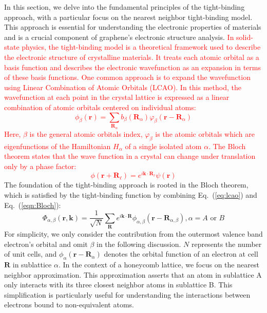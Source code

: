 In this section, we delve into the fundamental principles of the tight-binding approach, with a particular focus on the nearest neighbor tight-binding model. This approach is essential for understanding the electronic properties of materials and is a crucial component of graphene's electronic structure analysis.
\textcolor{red}{In solid-state physics, the tight-binding model is a theoretical framework used to describe the electronic structure of crystalline materials. It treats each atomic orbital as a basis function and describes the electronic wavefunction as an expansion in terms of these basis functions. One common approach is to expand the wavefunction using Linear Combination of Atomic Orbitals (\gls{LCAO}). In this method, the wavefunction at each point in the crystal lattice is expressed as a linear combination of atomic orbitals centered on individual atoms:}
\textcolor{red}{
	\begin{equation}
		\phi_{\beta}(\mathbf{r})=\sum_{\mathbf{R}_{\alpha}} b_{\beta}\left(\mathbf{R}_{\alpha}\right) \varphi_{\beta}\left(\mathbf{r}-\mathbf{R}_{\alpha}\right)
		\label{eq:lcao}
	\end{equation}
	Here, $\beta$ is the general atomic orbitals index, $\varphi_{\beta}$ is the atomic orbitals which are eigenfunctions of the Hamiltonian $H_{\alpha}$ of a single isolated atom $\alpha$.
	The Bloch theorem states that the wave function in a crystal can change under translation only by a phase factor:
	\begin{equation}
		\phi\left(\mathbf{r}+\mathbf{R}_{\ell}\right)=e^{i \mathbf{k} \cdot \mathbf{R}_{\ell}} \psi(\mathbf{r})
		\label{eqn:bloch}
	\end{equation}
}
The foundation of the tight-binding approach is rooted in the Bloch theorem, which is satisfied by the tight-binding function by combining Eq.~(\ref{eq:lcao}) and Eq.~(\ref{eqn:Bloch}):
\begin{equation}
	\Phi_{\alpha,\beta}(\mathbf{r}, \mathbf{k})=\frac{1}{\sqrt{N}} \sum_{\mathbf{R}} e^{i \mathbf{k}
			\cdot \mathbf{R}} \phi_{\alpha,\beta}\left(\mathbf{r}-\mathbf{R}_{\alpha,\beta}\right), \alpha=A \text { or } B
	\label{eqn:Bloch}
\end{equation}
For simplicity, we only consider the contribution from the outermost valence band electron's
orbital and omit $\beta$ in the following discussion. $N$ represents the number of unit cells, and $\phi_{\alpha}(\mathbf{r} - \mathbf{R}_{\alpha})$ denotes the orbital function of an electron at cell $\mathbf{R}$ in sublattice $\alpha$.
In the context of a honeycomb lattice, we focus on the nearest neighbor approximation. This approximation asserts that an atom in sublattice A only interacts with its three closest neighbor atoms in sublattice B. This simplification is particularly useful for understanding the interactions between electrons bound to non-equivalent atoms.

